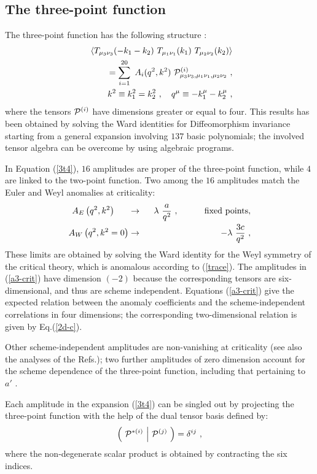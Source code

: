 \documentclass[proceedings]{JHEP}
\newcommand{\beq}{\begin{equation}}
\newcommand{\eeq}{\end{equation}}
\newcommand{\bea}{\begin{eqnarray}}
\newcommand{\eea}{\end{eqnarray}}
\def\d{\delta}
\def\l{\lambda}
\def\nl{\nonumber\\}
\def\bra{\langle}
\def\ket{\rangle}
\begin{document}
\bigskip


\subsection{The three-point function}

The three-point function has the following structure \cite{kaguma}:
\bea
\!\!\! &&\bra T_{\mu_3\nu_3}(-k_1-k_2)\ T_{\mu_1\nu_1}(k_1)\ 
T_{\mu_2\nu_2}(k_2) \ket \nl
\!\!\! && = \sum_{i=1}^{20}\ A_i(q^2,k^2) \ 
{\cal P}^{(i)}_{\mu_3\nu_3,\mu_1\nu_1,\mu_2\nu_2}\ ,\nl
\!\!\! &&\ \  k^2\equiv k_1^2=k_2^2\ , \quad q^\mu\equiv -k_1^\mu-k_2^\mu\ ,
\label{3t4}\eea
where the tensors ${\cal P}^{(i)}$ have dimensions greater or equal to four.
This results has been obtained by solving
the Ward identities for Diffeomorphism invariance starting
from a general expansion involving $137$ basic polynomials;
the involved tensor algebra can be overcome 
by using algebraic programs.

In Equation (\ref{3t4}), $16$ amplitudes are proper of the three-point
function,  while $4$ are linked to the two-point function.
Two among the $16$ amplitudes match the Euler and Weyl
anomalies at criticality:
\bea
A_E \left(q^2,k^2 \right)\ \ \ \ \  &\to &\ \ \l\ \frac{a}{q^2}\ ,
\qquad\quad   {\rm fixed\ points},\nl
A_W \left(q^2,k^2=0 \right) &\to & - \l\ \frac{3c}{q^2}\ ,
\label{a3-crit}\eea
These limits are obtained by solving the Ward identity
for the Weyl symmetry of the critical theory,
which is anomalous according to (\ref{trace}).
The amplitudes in (\ref{a3-crit}) have dimension $(-2)$ 
because the corresponding tensors are six-dimen\-sional,
and thus are scheme independent.
Equations (\ref{a3-crit}) give the expected relation
between the anomaly coefficients and the scheme-inde\-pendent correlations
in four dimensions; the corresponding two-dimensional
relation is given by Eq.(\ref{2d-c}).

Other scheme-independent amplitudes are non-vanishing at criticality 
(see also the analyses of the Refs.\cite{ol});
two further amplitudes of zero dimension account for
the scheme dependence of the three-point function, including
that pertaining to $a'$ \cite{kaguma}.

Each amplitude in the expansion (\ref{3t4})
can be singled out by projecting the three-point function
with the help of the dual tensor basis defined by:
\beq
\left(\ {\cal P}^{*(i)}\ \Big\vert\ {\cal P}^{(j)}\ \right) =
\d^{ij}\ ,
\label{dual}\eeq
where the non-degenerate scalar product is obtained by
contracting the six indices.
\end{document}
